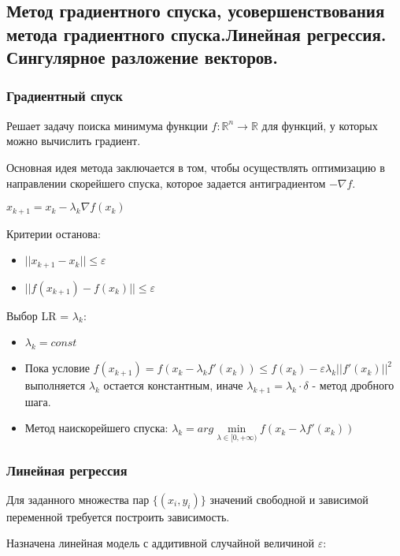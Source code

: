 \documentclass{article}
\begin{document}
\subsection{Метод градиентного спуска, усовершенствования метода градиентного
спуска.Линейная регрессия. Сингулярное разложение векторов.}

\subsubsection{Градиентный спуск}

Решает задачу поиска минимума функции $f: \mathbb{R}^n \to \mathbb{R}$ для
функций, у которых можно вычислить градиент.

Основная идея метода заключается в том, чтобы осуществлять оптимизацию
в направлении скорейшего спуска, которое задается антиградиентом $-\nabla f$.

$x_{k+1} = x_k - \lambda_k \nabla f(x_k)$

Критерии останова:
\begin{itemize}
	\item $||x_{k+1} - x_{k}|| \leq \varepsilon$
	\item $||f(x_{k+1}) - f(x_k)|| \leq \varepsilon$
\end{itemize}

Выбор LR = $\lambda_k$:
\begin{itemize}
	\item $\lambda_k = const$
	\item Пока условие $f(x_{k+1}) = f(x_k - \lambda_k f'(x_k)) \leq
	f(x_k) - \varepsilon\lambda_k ||f'(x_k)||^2$ выполняется $\lambda_k$
	остается константным, иначе $\lambda_{k+1} = \lambda_k \cdot \delta$
	- метод дробного шага.
	\item Метод наискорейшего спуска: $\lambda_k = arg 
	\min\limits_{\lambda \in [0, +\infty)} f(x_k - \lambda f'(x_k))$
\end{itemize}

\subsubsection{Линейная регрессия}


Для заданного множества пар $\{(x_i, y_i)\}$ значений свободной и зависимой
переменной требуется построить зависимость.

Назначена линейная модель с аддитивной случайной величиной $\varepsilon$:
\end{document}
